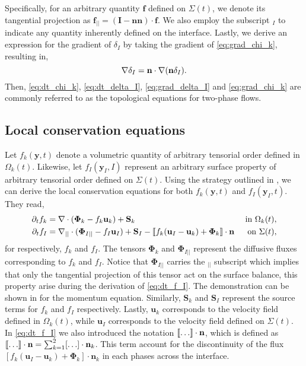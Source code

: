 Specifically, for an arbitrary quantity $\textbf{f}$ defined on $\Sigma(t)$, we denote its tangential projection as $\textbf{f}_{||} = (\textbf{I}-\textbf{nn})\cdot \textbf{f}$. 
We also employ the subscript $_I$ to indicate any quantity inherently defined on the interface. 
Lastly, we derive an expression for the gradient of $\delta_I$ by taking the gradient of \ref{eq:grad_chi_k}, resulting in,
\begin{equation}
    \mathbf{\nabla}\delta_I 
    = \textbf{n} \cdot \mathbf{\nabla} (\textbf{n} \delta_I).
    \label{eq:grad_delta_I}
\end{equation}
Then, \ref{eq:dt_chi_k}, \ref{eq:dt_delta_I}, \ref{eq:grad_delta_I} and \ref{eq:grad_chi_k} are commonly referred to as the topological equations for two-phase flows.

\subsection{Local conservation equations}

Let $f_k(\textbf{y},t)$ denote a volumetric quantity of arbitrary tensorial order defined in $\Omega_k(t)$.
Likewise, let $f_I(\textbf{y}_I,I)$ represent an arbitrary surface property of arbitrary tensorial order defined on $\Sigma(t)$.
Using the strategy outlined in \citep{bothe2022sharp,morel2015mathematical,slattery2007interfacial}, we can derive the local conservation equations for both $f_k(\textbf{y},t)$ and $f_I(\textbf{y}_I,t)$.
They read,  
\begin{align}
    \label{eq:dt_f_k}
    \partial_t f_k
    &= \mathbf{\nabla} \cdot \left(
        \mathbf{\Phi}_k
        - f_k\textbf{u}_k
        \right)
    + \textbf{S}_k
    & \text{ in } \Omega_k(t),&\\
    \partial_t f_I  
    &= 
    \mathbf{\nabla}_{||} \cdot (\mathbf{\Phi}_{I||} - f_I \textbf{u}_I)
    + \textbf{S}_I
    - \llbracket 
        f_k (\textbf{u}_I - \textbf{u}_k)
        + \mathbf{\Phi}_k
      \rrbracket \cdot \textbf{n} 
    & \text{ on } \Sigma(t),&
    \label{eq:dt_f_I}
\end{align}
for respectively, $f_k$ and $f_I$.
The tensors $\mathbf{\Phi}_k$ and $\mathbf{\Phi}_{I||}$ represent the diffusive fluxes corresponding to $f_k$ and $f_I$. 
Notice that $\mathbf{\Phi}_{I||}$ carries the $_{||}$ subscript which implies that only the tangential projection of this tensor act on the surface balance, this property arise during the derivation of \ref{eq:dt_f_I}. 
The demonstration can be shown in \citet[Chapter 2]{slattery2007interfacial} for the momentum equation. 
Similarly, $\textbf{S}_k$ and $\textbf{S}_I$ represent the source terms for $f_k$ and $f_I$ respectively.
Lastly, $\textbf{u}_k$ corresponds to the velocity field defined in $\Omega_k(t)$, while $\textbf{u}_I$ corresponds to the velocity field defined on $\Sigma(t)$.
In \ref{eq:dt_f_I} we also introduced the notation $\llbracket \ldots \rrbracket \cdot \textbf{n}$, which is defined as $\llbracket \ldots \rrbracket \cdot \textbf{n} = \sum_{k=1}^2 [\ldots] \cdot \textbf{n}_k$.
This term account for the discontinuity of the flux $\left[f_k (\textbf{u}_I - \textbf{u}_k)+ \mathbf{\Phi}_k\right]\cdot\textbf{n}_k$ in each phases across the interface.

